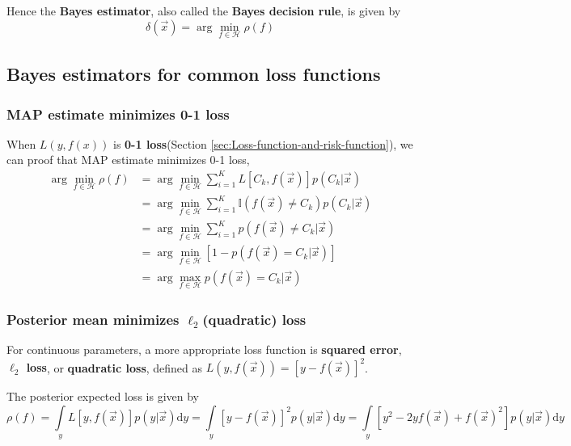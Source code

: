 Hence the \textbf{Bayes estimator}, also called the \textbf{Bayes decision rule}, is given by
\begin{equation}
\delta(\vec{x})=\arg\min\limits_{f \in \mathcal{H}} \rho(f)
\end{equation}


\subsection{Bayes estimators for common loss functions}


\subsubsection{MAP estimate minimizes 0-1 loss}
When $L(y,f(x))$ is \textbf{0-1 loss}(Section \ref{sec:Loss-function-and-risk-function}), we can proof that MAP estimate minimizes 0-1 loss, 
\begin{align*}
\arg\min\limits_{f \in \mathcal{H}} \rho(f)& =\arg\min\limits_{f \in \mathcal{H}} \sum\limits_{i=1}^K{L[C_k,f(\vec{x})]p(C_k|\vec{x})} \\
         & =\arg\min\limits_{f \in \mathcal{H}} \sum\limits_{i=1}^K{\mathbb{I}(f(\vec{x}) \neq C_k)p(C_k|\vec{x})} \\
		 & =\arg\min\limits_{f \in \mathcal{H}} \sum\limits_{i=1}^K{p(f(\vec{x}) \neq C_k|\vec{x})} \\
		 & =\arg\min\limits_{f \in \mathcal{H}} \left[1-{p(f(\vec{x}) = C_k|\vec{x})}\right] \\
		 & =\arg\max\limits_{f \in \mathcal{H}} p(f(\vec{x}) = C_k|\vec{x})
\end{align*}


\subsubsection{Posterior mean minimizes	$\ell_2$(quadratic) loss}
For continuous parameters, a more appropriate loss function is \textbf{squared error}, \textbf{$\ell_2$ loss}, or \textbf{quadratic loss}, defined as $L(y,f(\vec{x}))=\left[y-f(\vec{x})\right]^2$.

The posterior expected loss is given by
\begin{equation}
\rho(f)=\int\limits_y L[y,f(\vec{x})]p(y|\vec{x})\mathrm{d}y=\int\limits_y \left[y-f(\vec{x})\right]^2p(y|\vec{x})\mathrm{d}y=\int\limits_y \left[y^2-2yf(\vec{x})+f(\vec{x})^2\right]p(y|\vec{x})\mathrm{d}y
\end{equation}

